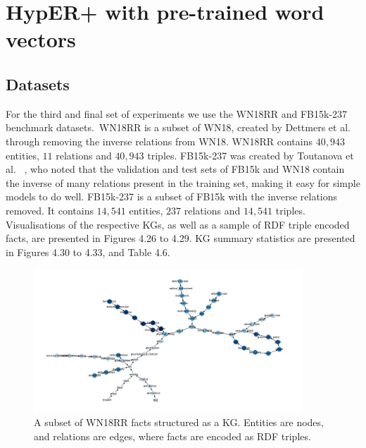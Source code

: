 
\section{HypER+ with pre-trained word vectors}

\subsection{Datasets} 
For the third and final set of experiments we use the WN18RR and FB15k-237 benchmark datasets.\ WN18RR is a subset of WN18, created by Dettmers et al. \unskip~\citep{dettmers2018convolutional} through removing the inverse relations from WN18. WN18RR contains $ 40, 943 $ entities, $ 11 $ relations and $ 40,943 $ triples. FB15k-237 was created by Toutanova et al. \unskip~\citep{toutanova2015observed}, who noted that the validation and test sets of FB15k and WN18 contain the inverse of many relations present in the training set, making it easy for simple models to do well. FB15k-237 is a subset of FB15k with the inverse relations removed. It contains $ 14, 541 $ entities, $ 237 $ relations and $ 14,541 $ triples. Visualisations of the respective KGs, as well as a sample of RDF triple encoded facts, are presented in Figures 4.26 to 4.29. KG summary statistics are presented in Figures 4.30 to 4.33, and Table 4.6. 

\begin{figure}
   	\centering
    	\includegraphics[width=0.9\textwidth, height=0.6\textwidth]{WN18RR_Graph}
	\captionsetup{justification=centering}
	\caption{A subset of WN18RR facts structured as a KG. Entities are nodes, and relations are edges, where facts are encoded as RDF triples.}
\end{figure}

